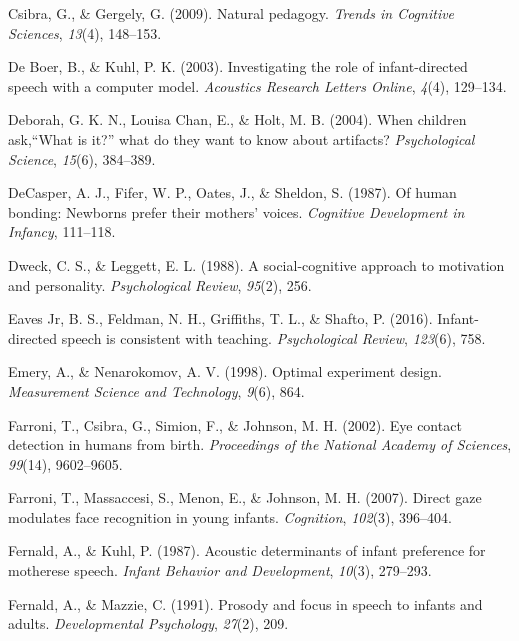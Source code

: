 \documentclass[oneside]{report}
\begin{document}
\hypertarget{ref-csibra2009natural}{}
Csibra, G., \& Gergely, G. (2009). Natural pedagogy. \emph{Trends in
Cognitive Sciences}, \emph{13}(4), 148--153.

\hypertarget{ref-de2003investigating}{}
De Boer, B., \& Kuhl, P. K. (2003). Investigating the role of
infant-directed speech with a computer model. \emph{Acoustics Research
Letters Online}, \emph{4}(4), 129--134.

\hypertarget{ref-deborah2004children}{}
Deborah, G. K. N., Louisa Chan, E., \& Holt, M. B. (2004). When children
ask,``What is it?'' what do they want to know about artifacts?
\emph{Psychological Science}, \emph{15}(6), 384--389.

\hypertarget{ref-decasper1987human}{}
DeCasper, A. J., Fifer, W. P., Oates, J., \& Sheldon, S. (1987). Of
human bonding: Newborns prefer their mothers' voices. \emph{Cognitive
Development in Infancy}, 111--118.

\hypertarget{ref-dweck1988social}{}
Dweck, C. S., \& Leggett, E. L. (1988). A social-cognitive approach to
motivation and personality. \emph{Psychological Review}, \emph{95}(2),
256.

\hypertarget{ref-eaves2016infant}{}
Eaves Jr, B. S., Feldman, N. H., Griffiths, T. L., \& Shafto, P. (2016).
Infant-directed speech is consistent with teaching. \emph{Psychological
Review}, \emph{123}(6), 758.

\hypertarget{ref-emery1998optimal}{}
Emery, A., \& Nenarokomov, A. V. (1998). Optimal experiment design.
\emph{Measurement Science and Technology}, \emph{9}(6), 864.

\hypertarget{ref-farroni2002eye}{}
Farroni, T., Csibra, G., Simion, F., \& Johnson, M. H. (2002). Eye
contact detection in humans from birth. \emph{Proceedings of the
National Academy of Sciences}, \emph{99}(14), 9602--9605.

\hypertarget{ref-farroni2007direct}{}
Farroni, T., Massaccesi, S., Menon, E., \& Johnson, M. H. (2007). Direct
gaze modulates face recognition in young infants. \emph{Cognition},
\emph{102}(3), 396--404.

\hypertarget{ref-fernald1987acoustic}{}
Fernald, A., \& Kuhl, P. (1987). Acoustic determinants of infant
preference for motherese speech. \emph{Infant Behavior and Development},
\emph{10}(3), 279--293.

\hypertarget{ref-fernald1991prosody}{}
Fernald, A., \& Mazzie, C. (1991). Prosody and focus in speech to
infants and adults. \emph{Developmental Psychology}, \emph{27}(2), 209.
\end{document}
